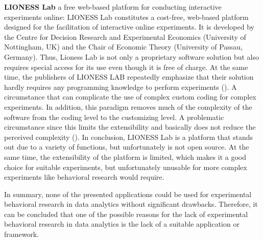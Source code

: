 \textbf{LIONESS Lab} a free web-based platform for conducting interactive experiments online:
LIONESS Lab constitutes a cost-free, web-based platform designed for the facilitation of interactive online experiments. It is developed by the Centre for Decision Research and Experimental Economics (University of Nottingham, UK) and the Chair of Economic Theory (University of Passau, Germany). Thus, Lioness Lab is not only a proprietary software solution but also requires special access for its use even though it is free of charge. %
At the same time, the publishers of LIONESS LAB repeatedly emphasize that their solution hardly requires any programming knowledge to perform experiments (\cite{Giamattei.2020}). A circumstance that can complicate the use of complex custom coding for complex experiments. In addition, this paradigm removes much of the complexity of the software from the coding level to the customizing level. A problematic circumstance since this limits the extensibility and basically does not reduce the perceived complexity (\cite{Chou.2008}). 
In conclusion, LIONESS Lab is a platform that stands out due to a variety of functions, but unfortunately is not open source. At the same time, the extensibility of the platform is limited, which makes it a good choice for suitable experiments, but unfortunately unusable for more complex experiments like behavioral research would require. 

In summary, none of the presented applications could be used for experimental behavioral research in data analytics without significant drawbacks. Therefore, it can be concluded that one of the possible reasons for the lack of experimental behavioral research in data analytics is the lack of a suitable application or framework.
